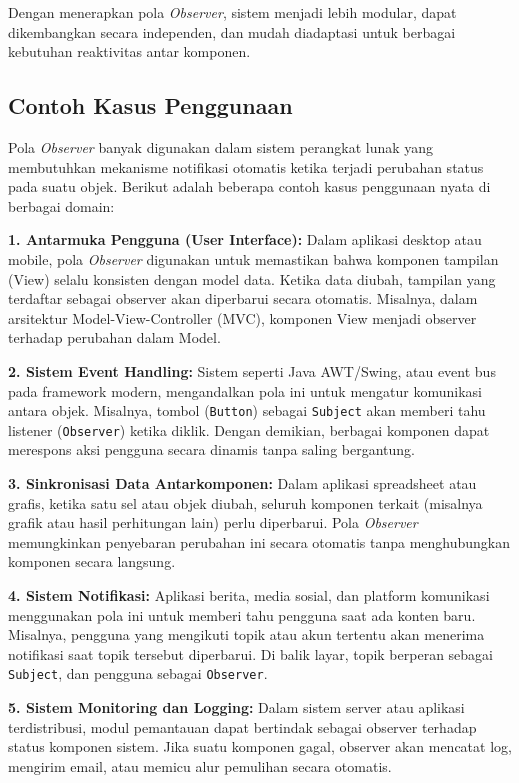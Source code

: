Dengan menerapkan pola \textit{Observer}, sistem menjadi lebih modular, dapat dikembangkan secara independen, dan mudah diadaptasi untuk berbagai kebutuhan reaktivitas antar komponen.

\subsection{Contoh Kasus Penggunaan}

Pola \textit{Observer} banyak digunakan dalam sistem perangkat lunak yang membutuhkan mekanisme notifikasi otomatis ketika terjadi perubahan status pada suatu objek. Berikut adalah beberapa contoh kasus penggunaan nyata di berbagai domain:

\textbf{1. Antarmuka Pengguna (User Interface):}  
Dalam aplikasi desktop atau mobile, pola \textit{Observer} digunakan untuk memastikan bahwa komponen tampilan (View) selalu konsisten dengan model data. Ketika data diubah, tampilan yang terdaftar sebagai observer akan diperbarui secara otomatis. Misalnya, dalam arsitektur Model-View-Controller (MVC), komponen View menjadi observer terhadap perubahan dalam Model.

\textbf{2. Sistem Event Handling:}  
Sistem seperti Java AWT/Swing, atau event bus pada framework modern, mengandalkan pola ini untuk mengatur komunikasi antara objek. Misalnya, tombol (\texttt{Button}) sebagai \texttt{Subject} akan memberi tahu listener (\texttt{Observer}) ketika diklik. Dengan demikian, berbagai komponen dapat merespons aksi pengguna secara dinamis tanpa saling bergantung.

\textbf{3. Sinkronisasi Data Antarkomponen:}  
Dalam aplikasi spreadsheet atau grafis, ketika satu sel atau objek diubah, seluruh komponen terkait (misalnya grafik atau hasil perhitungan lain) perlu diperbarui. Pola \textit{Observer} memungkinkan penyebaran perubahan ini secara otomatis tanpa menghubungkan komponen secara langsung.

\textbf{4. Sistem Notifikasi:}  
Aplikasi berita, media sosial, dan platform komunikasi menggunakan pola ini untuk memberi tahu pengguna saat ada konten baru. Misalnya, pengguna yang mengikuti topik atau akun tertentu akan menerima notifikasi saat topik tersebut diperbarui. Di balik layar, topik berperan sebagai \texttt{Subject}, dan pengguna sebagai \texttt{Observer}.

\textbf{5. Sistem Monitoring dan Logging:}  
Dalam sistem server atau aplikasi terdistribusi, modul pemantauan dapat bertindak sebagai observer terhadap status komponen sistem. Jika suatu komponen gagal, observer akan mencatat log, mengirim email, atau memicu alur pemulihan secara otomatis.

